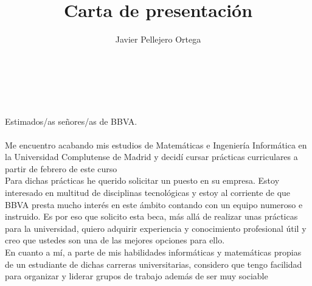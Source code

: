 \documentclass[11pt, oneside]{book}
\title{Carta de presentación}
\author{Javier Pellejero Ortega}
\begin{document}
\ \\\ \\\ \\
Estimados/as señores/as de BBVA.\\\ \\

Me encuentro acabando mis estudios de Matemáticas e Ingeniería Informática en la Universidad Complutense de Madrid y decidí cursar prácticas curriculares a partir de febrero de este curso\\

Para dichas prácticas he querido solicitar un puesto en su empresa. Estoy interesado en multitud de disciplinas tecnológicas y estoy al corriente de que BBVA presta mucho interés en este ámbito contando con un equipo numeroso e instruido. Es por eso que solicito esta beca, más allá de realizar unas prácticas para la universidad, quiero adquirir experiencia y conocimiento profesional útil y creo que ustedes son una de las mejores opciones para ello.\\

En cuanto a mí, a parte de mis habilidades informáticas y matemáticas propias de un estudiante de dichas carreras universitarias, considero que tengo facilidad para organizar y liderar grupos de trabajo además de ser muy sociable
\end{document}
